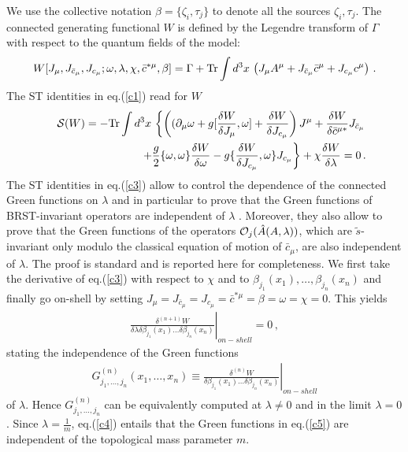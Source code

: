 \documentclass[a4paper,11pt]{article}
\def\G{\Gamma}
\begin{document}
We use the collective
notation $\beta = \{ \zeta_i, \tau_j \}$ to denote all the sources $\zeta_i,
\tau_j$.
The connected generating functional $W$ is defined by the Legendre
transform of $\G$ with respect to the quantum fields of the model:
%
\begin{eqnarray}
W[J_\mu,J_{{\bar c}_\mu},J_{c_\mu};\omega, \lambda,\chi,\bar c^{* \mu},\beta] = 
\G + {\rm Tr} \int d^3x \, \left ( J_\mu A^\mu + J_{{\bar c}_\mu}{\bar c}^\mu
+ J_{c_\mu} c^\mu \right ) \, .
\label{c2}
\end{eqnarray}
%
The ST identities in eq.(\ref{c1}) read for $W$
%
\begin{eqnarray}
&& \!\!\!\!\!
{\cal S}(W)  =  - {\rm Tr} \int d^3x \, \left \{ \left ( (\partial_\mu \omega + g [ \frac{\delta W}{\delta J_\mu}, \omega]
+ \frac{\delta W}{\delta  J_{c_\mu}} \right ) J^\mu + \frac{\delta W}{\delta {\bar c}^{\mu *}} J_{{\bar c}_\mu}
\right .
\nonumber \\
&& ~~~~~~~~~~~~~~~~~~~~~~~~ \left . + \frac{g}{2} \{ \omega, \omega \} \frac{\delta W}{\delta \omega} - g \{ \frac{\delta W}{\delta J_{c_\mu}}, \omega \}
J_{c_\mu} \right \}
 + \chi \frac{\delta W}{\delta \lambda} =0 \, .
\label{c3}
\end{eqnarray}
%
The ST identities in eq.(\ref{c3}) allow to control the dependence of the connected Green functions on $\lambda$
and in particular to prove that the Green functions of BRST-invariant operators are independent of $\lambda$
\cite{Piguet:er,Piguet:1984js}.
Moreover, they also allow to prove that the Green functions of the operators ${\cal O}_j(\hat A(A,\lambda))$,
which are $\tilde s$-invariant
only modulo the classical equation of motion of $\bar c_\mu$, 
are also independent of $\lambda$.
The proof is standard \cite{Piguet:er,Piguet:1984js,ET}
and is reported here for completeness.
We first take the derivative of eq.(\ref{c3}) with respect to $\chi$ and
to $\beta_{j_1}(x_1), \dots, \beta_{j_n}(x_n)$ 
and finally go on-shell by setting $J_\mu=J_{{\bar c}_\mu}=J_{c_\mu}=\bar c^{* \mu}=\beta=\omega=\chi=0$.
This yields
%
\begin{eqnarray}
\left . \frac{\delta^{(n+1)} W}{\delta \lambda \delta \beta_{j_1}(x_1) \dots \delta \beta_{j_n}(x_n)} 
\right|_{on-shell} = 0 \, ,
\label{c4}
\end{eqnarray}
%
stating the independence of the Green functions 
%
\begin{eqnarray}
G^{(n)}_{j_1,\dots,j_n}(x_1,\dots,x_n) \equiv \left . \frac{\delta^{(n)} W}{\delta \beta_{j_1}(x_1) \dots \delta \beta_{j_n}(x_n)}
\right |_{on-shell}
\label{c5}
\end{eqnarray}
%
of $\lambda$.
%
Hence $G^{(n)}_{j_1,\dots,j_n}$
 can be equivalently computed at $\lambda \neq 0$ and
in the limit $\lambda=0$.
Since $\lambda=\frac{1}{m}$, eq.(\ref{c4}) entails that the Green functions 
in eq.(\ref{c5}) are independent of the topological mass parameter $m$.
\end{document}
